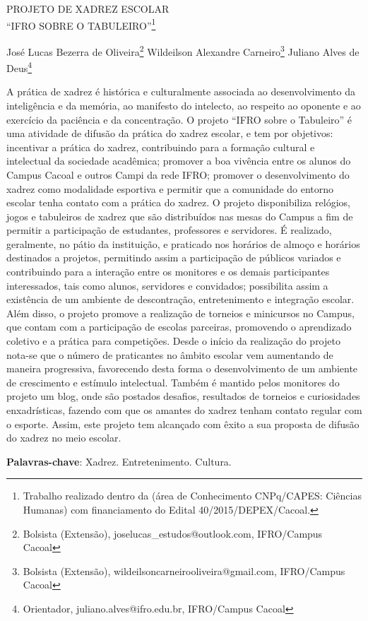 \documentclass[article,12pt,onesidea,4paper,english,brazil]{abntex2}
\begin{document}
	
	
	\frenchspacing 
	
	\begin{center}
		\LARGE PROJETO DE XADREZ ESCOLAR\\``IFRO SOBRE O TABULEIRO''\footnote{Trabalho realizado dentro da (área de Conhecimento CNPq/CAPES: Ciências Humanas) com financiamento do Edital 40/2015/DEPEX/Cacoal.}
		
		\normalsize
		José Lucas Bezerra de Oliveira\footnote{Bolsista (Extensão), joselucas\_estudos@outlook.com, IFRO/Campus Cacoal} 
		Wildeilson Alexandre Carneiro\footnote{Bolsista (Extensão), wildeilsoncarneirooliveira@gmail.com, IFRO/Campus Cacoal} 
		Juliano Alves de Deus\footnote{Orientador, juliano.alves@ifro.edu.br, IFRO/Campus Cacoal} 
	 
	\end{center}
	
	\noindent A prática de xadrez é histórica e culturalmente associada ao desenvolvimento da inteligência e da memória, ao manifesto do intelecto, ao respeito ao oponente e ao exercício da paciência e da concentração. O projeto “IFRO sobre o Tabuleiro” é uma atividade de difusão da prática do xadrez escolar, e tem por objetivos: incentivar a prática do xadrez, contribuindo para a formação cultural e intelectual da sociedade acadêmica; promover a boa vivência entre os alunos do Campus Cacoal e outros Campi da rede IFRO; promover o desenvolvimento do xadrez como modalidade esportiva e permitir que a comunidade do entorno escolar tenha contato com a prática do xadrez. O projeto disponibiliza relógios, jogos e tabuleiros de xadrez que são distribuídos nas mesas do Campus a fim de permitir a participação de estudantes, professores e servidores. É realizado, geralmente, no pátio da instituição, e praticado nos horários de almoço e horários destinados a projetos, permitindo assim a participação de públicos variados e contribuindo para a interação entre os monitores e os demais participantes interessados, tais como alunos, servidores e convidados; possibilita assim a existência de um ambiente de descontração, entretenimento e integração escolar. Além disso, o projeto promove a realização de torneios e minicursos no Campus, que contam com a participação de escolas parceiras, promovendo o aprendizado coletivo e a prática para competições. Desde o início da realização do projeto nota-se que o número de praticantes no âmbito escolar vem aumentando de maneira progressiva, favorecendo desta forma o desenvolvimento de um ambiente de crescimento e estímulo intelectual. Também é mantido pelos monitores do projeto um blog, onde são postados desafios, resultados de torneios e curiosidades enxadrísticas, fazendo com que os amantes do xadrez tenham contato regular com o esporte. Assim, este projeto tem alcançado com êxito a sua proposta de difusão do xadrez no meio escolar.
	
	\vspace{\onelineskip}
	
	\noindent
	\textbf{Palavras-chave}: Xadrez. Entretenimento. Cultura.
	
\end{document}
